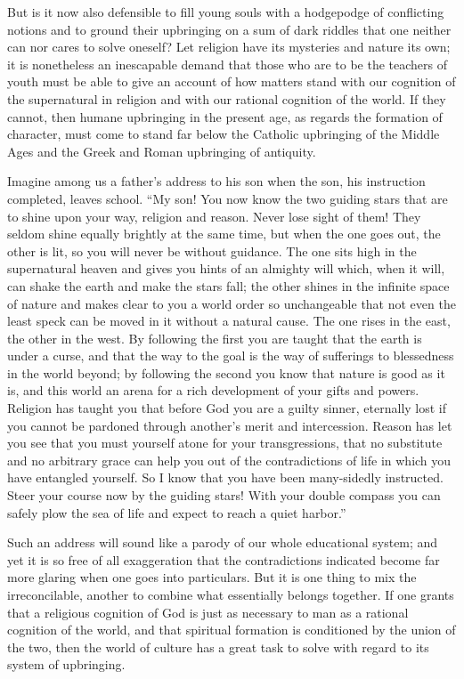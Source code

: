 \documentclass[12pt,a4paper,openany]{book}
\newcommand{\opage}[1]{\marginnote{\footnotesize\textit{[#1]}}}
\begin{document}
But is it now also defensible to fill young souls with a hodgepodge of
conflicting notions and to ground their upbringing on a sum of dark
riddles that one neither can nor cares to solve oneself? Let religion
have its mysteries and nature its own; it is nonetheless an inescapable
demand that those who are to be the teachers of youth must be able to
give an account of how matters stand with our cognition of the
supernatural in religion and with our rational cognition of the world.
If they cannot, then humane upbringing in the present age, as regards the
formation of character, must come to stand far below the Catholic
upbringing of the Middle Ages and the Greek and Roman upbringing of
antiquity.

Imagine among us a father's address to his son when the son, his
instruction completed, leaves school. ``My son! You now know the two
guiding stars that are to shine upon your way, religion and reason. Never
lose sight of them! They seldom shine equally brightly \opage{11}at the same time,
but when the one goes out, the other is lit, so you will never be without
guidance. The one sits high in the supernatural heaven and gives you
hints of an almighty will which, when it will, can shake the earth and
make the stars fall; the other shines in the infinite space of nature and
makes clear to you a world order so unchangeable that not even the least
speck can be moved in it without a natural cause. The one rises in the
east, the other in the west. By following the first you are taught that
the earth is under a curse, and that the way to the goal is the way of
sufferings to blessedness in the world beyond; by following the second
you know that nature is good as it is, and this world an arena for a rich
development of your gifts and powers. Religion has taught you that before
God you are a guilty sinner, eternally lost if you cannot be pardoned
through another's merit and intercession. Reason has let you see that you
must yourself atone for your transgressions, that no substitute and no
arbitrary grace can help you out of the contradictions of life in which
you have entangled yourself. So I know that you have been many-sidedly
instructed. Steer your course now by the guiding stars! With your double
compass you can safely plow the sea of life and expect to reach a quiet
harbor.''

Such an address will sound like a parody of our whole educational system;
and yet it is so free of all exaggeration that the contradictions
indicated become far more glaring when one goes into particulars. But it
is one thing to mix the irreconcilable, another to combine what
essentially belongs together. If one grants that a religious cognition of
God is just as necessary to man as a rational cognition of the world, and
\opage{12}that spiritual formation is conditioned by the union of the two, then the
world of culture has a great task to solve with regard to its system of
upbringing.
\end{document}
